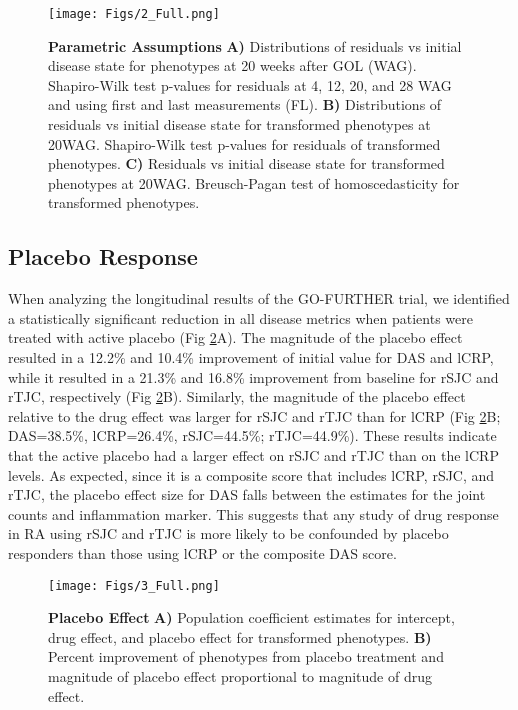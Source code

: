 \begin{figure}[h!]
  \centering
  \texttt{[image: Figs/2\_Full.png]}
  \caption{ {\bf Parametric Assumptions} {\bf A)} Distributions of residuals vs initial disease state for phenotypes at 20 weeks after GOL (WAG). Shapiro-Wilk test p-values for residuals at 4, 12,  20, and 28 WAG and using first and last measurements (FL). {\bf B)} Distributions of residuals vs initial disease state for transformed phenotypes at 20WAG. Shapiro-Wilk test p-values for residuals of transformed phenotypes. {\bf C)} Residuals vs initial disease state for transformed phenotypes at 20WAG. Breusch-Pagan test of homoscedasticity for transformed phenotypes. }
  \label{FIG_2}
\end{figure}

\subsection*{Placebo Response}


When analyzing the longitudinal results of the GO-FURTHER trial, we identified a statistically significant reduction in all disease metrics when patients were treated with active placebo (Fig \ref{FIG_3}A). The magnitude of the placebo effect resulted in a 12.2\% and 10.4\% improvement of initial value for DAS and lCRP, while it resulted in a 21.3\% and 16.8\% improvement from baseline for rSJC and rTJC, respectively (Fig \ref{FIG_3}B). Similarly, the magnitude of the placebo effect relative to the drug effect was larger for rSJC and rTJC than for lCRP (Fig \ref{FIG_3}B; DAS=38.5\%, lCRP=26.4\%, rSJC=44.5\%; rTJC=44.9\%). These results indicate that the active placebo had a larger effect on rSJC and rTJC than on the lCRP levels. As expected, since it is a composite score that includes lCRP, rSJC, and rTJC, the placebo effect size for DAS falls between the estimates for the joint counts and inflammation marker. This suggests that any study of drug response in RA using rSJC and rTJC is more likely to be confounded by placebo responders than those using lCRP or the composite DAS score.

\begin{figure}[h!]
  \centering
  \texttt{[image: Figs/3\_Full.png]}
  \caption{ {\bf Placebo Effect} {\bf A)} Population coefficient estimates for intercept, drug effect, and placebo effect for transformed phenotypes. {\bf B)} Percent improvement of phenotypes from placebo treatment and magnitude of placebo effect proportional to magnitude of drug effect. }
  \label{FIG_3}
\end{figure}

